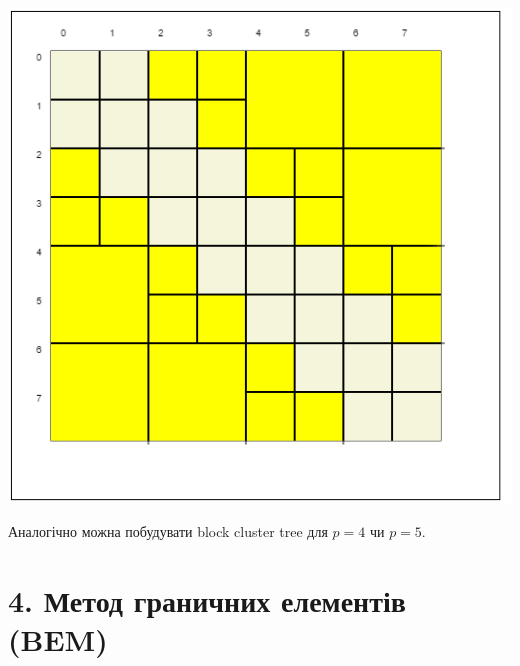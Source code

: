 \documentclass[12pt]{report}
\begin{document}
\begin{enumerate}
	\includegraphics[scale=0.5]{1_4}
	\end{enumerate}
	\par Аналогічно можна побудувати block cluster tree  для $p=4$ чи $p=5$.
	\chapter{4. Метод граничних елементів (BEM)}
\end{document}
